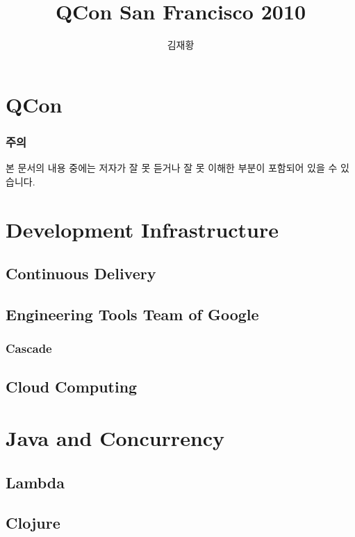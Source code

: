 \documentclass[10pt,unicode,serif,compress,slidetop]{beamer}
\title{QCon San Francisco 2010}
\author{김재황}
\institute{소프트웨어 센터}
\begin{document}
\begin{frame}[plain]
    \titlepage
\end{frame}

\section{QCon}


\begin{frame}
\frametitle{주의}

본 문서의 내용 중에는 저자가 잘 못 듣거나 잘 못 이해한 부분이 
포함되어 있을 수 있습니다.

\end{frame}

\section{Development Infrastructure}
\subsection{Continuous Delivery}

\subsection{Engineering Tools Team of Google}

\subsubsection{Cascade}

\subsection{Cloud Computing}


\section{Java and Concurrency}

\subsection{Lambda}


\subsection{Clojure}


\end{document}
